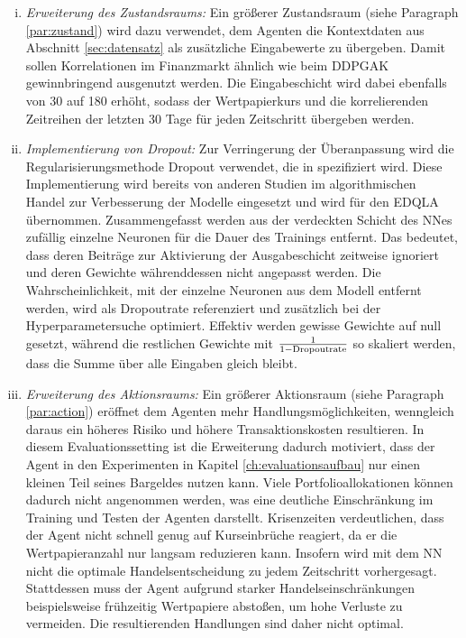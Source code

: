 \begin{enumerate}[(i)]
\item{\textit{Erweiterung des Zustandsraums:}}
Ein größerer Zustandsraum (siehe Paragraph \ref{par:zustand}) wird dazu verwendet, dem Agenten die Kontextdaten aus Abschnitt \ref{sec:datensatz} als zusätzliche Eingabewerte zu übergeben. 
Damit sollen Korrelationen im Finanzmarkt ähnlich wie beim \acs{DDPGAK} gewinnbringend ausgenutzt werden.
Die Eingabeschicht wird dabei ebenfalls von 30 auf 180 erhöht, sodass der Wertpapierkurs und die korrelierenden Zeitreihen der letzten 30 Tage für jeden Zeitschritt übergeben werden.
\item{\textit{Implementierung von Dropout:}}
Zur Verringerung der Überanpassung wird die Regularisierungsmethode Dropout verwendet, die in \parencite{hinton2012improving} spezifiziert wird.
Diese Implementierung wird bereits von anderen Studien \parencite{WU2020142,dropout2} im algorithmischen Handel zur Verbesserung der Modelle eingesetzt und wird für den \acs{EDQLA} übernommen.
Zusammengefasst werden aus der verdeckten Schicht des \acs{NN}es zufällig einzelne Neuronen für die Dauer des Trainings entfernt. Das bedeutet, dass deren Beiträge zur Aktivierung der Ausgabeschicht zeitweise ignoriert und deren Gewichte währenddessen nicht angepasst werden. Die Wahrscheinlichkeit, mit der einzelne Neuronen aus dem Modell entfernt werden, wird als Dropoutrate referenziert und zusätzlich bei der Hyperparametersuche optimiert.
Effektiv werden gewisse Gewichte auf null gesetzt, während die restlichen Gewichte mit $\frac{1}{1-\textnormal{Dropoutrate}}$ so skaliert werden, dass die Summe über alle Eingaben gleich bleibt.
\item{\textit{Erweiterung des Aktionsraums:}}
Ein größerer Aktionsraum (siehe Paragraph \ref{par:action}) eröffnet dem Agenten mehr Handlungsmöglichkeiten, wenngleich daraus ein höheres Risiko und höhere Transaktionskosten resultieren.
In diesem Evaluationssetting ist die Erweiterung dadurch motiviert, dass der Agent in den Experimenten in Kapitel \ref{ch:evaluationsaufbau} nur einen kleinen Teil seines Bargeldes nutzen kann.
Viele Portfolioallokationen können dadurch nicht angenommen werden, was eine deutliche Einschränkung im Training und Testen der Agenten darstellt.
Krisenzeiten verdeutlichen, dass der Agent nicht schnell genug auf Kurseinbrüche reagiert, da er die Wertpapieranzahl nur langsam reduzieren kann.
Insofern wird mit dem \acs{NN} nicht die optimale Handelsentscheidung zu jedem Zeitschritt vorhergesagt. Stattdessen muss der Agent aufgrund starker Handelseinschränkungen beispielsweise frühzeitig Wertpapiere abstoßen, um hohe Verluste zu vermeiden. Die resultierenden Handlungen sind daher nicht optimal.

\end{enumerate}
